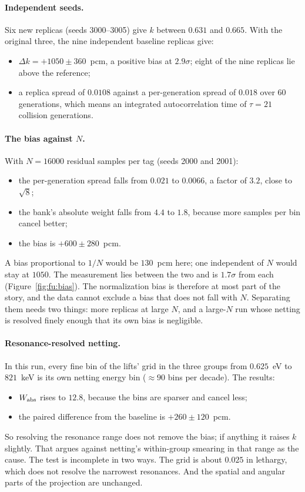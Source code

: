 \paragraph{Independent seeds.} Six new replicas (seeds 3000--3005) give $k$ between $0.631$ and
$0.665$. With the original three, the nine independent baseline replicas give:
\begin{itemize}
\item $\Delta k=+1050\pm360$~pcm, a positive bias at $2.9\sigma$; eight of the nine replicas lie above
  the reference;
\item a replica spread of $0.0108$ against a per-generation spread of $0.018$ over 60 generations,
  which means an integrated autocorrelation time of $\tau=21$ collision generations.
\end{itemize}

\paragraph{The bias against $N$.} With $N=16000$ residual samples per tag (seeds 2000 and 2001):
\begin{itemize}
\item the per-generation spread falls from $0.021$ to $0.0066$, a factor of $3.2$, close to $\sqrt8$;
\item the bank's absolute weight falls from $4.4$ to $1.8$, because more samples per bin cancel
  better;
\item the bias is $+600\pm280$~pcm.
\end{itemize}
A bias proportional to $1/N$ would be $130$~pcm here; one independent of $N$ would stay at $1050$.
The measurement lies between the two and is $1.7\sigma$ from each (Figure~\ref{fig:fu:bias}). The
normalization bias is therefore at most part of the story, and the data cannot exclude a bias that
does not fall with $N$. Separating them needs two things: more replicas at large $N$, and a large-$N$
run whose netting is resolved finely enough that its own bias is negligible.

\paragraph{Resonance-resolved netting.} In this run, every fine bin of the lifts' grid in the three
groups from $0.625$~eV to $821$~keV is its own netting energy bin ($\approx90$ bins per decade). The
results:
\begin{itemize}
\item $W_{\mathrm{abs}}$ rises to $12.8$, because the bins are sparser and cancel less;
\item the paired difference from the baseline is $+260\pm120$~pcm.
\end{itemize}
So resolving the resonance range does not remove the bias; if anything it raises $k$ slightly. That
argues against netting's within-group smearing in that range as the cause. The test is incomplete
in two ways. The grid is about $0.025$ in lethargy, which does not resolve the narrowest resonances.
And the spatial and angular parts of the projection are unchanged.

